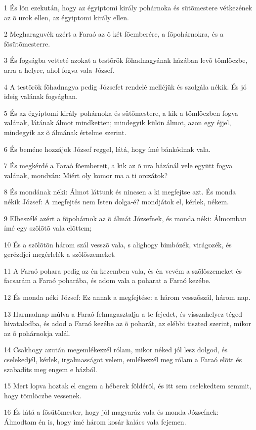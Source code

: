 \par 1 És lõn ezekután, hogy az égyiptomi király pohárnoka és sütõmestere vétkezének az õ urok ellen, az égyiptomi király ellen.
\par 2 Megharaguvék azért a Faraó az õ két fõemberére, a fõpohárnokra, és a fõsütõmesterre.
\par 3 És fogságba vetteté azokat a testõrök fõhadnagyának házában levõ tömlöczbe, arra a helyre, ahol fogva vala József.
\par 4 A testõrök fõhadnagya pedig Józsefet rendelé melléjük és szolgála nékik. És jó ideig valának fogságban.
\par 5 És az égyiptomi király pohárnoka és sütõmestere, a kik a tömlöczben fogva valának, látának álmot mindketten; mindegyik külön álmot, azon egy éjjel, mindegyik az õ álmának értelme szerint.
\par 6 És beméne hozzájok József reggel, látá, hogy ímé bánkódnak vala.
\par 7 És megkérdé a Faraó fõembereit, a kik az õ ura házánál vele együtt fogva valának, mondván: Miért oly komor ma a ti orczátok?
\par 8 És mondának néki: Álmot láttunk és nincsen a ki megfejtse azt. És monda nékik József: A megfejtés nem Isten dolga-é? mondjátok el, kérlek, nékem.
\par 9 Elbeszélé azért a fõpohárnok az õ álmát Józsefnek, és monda néki: Álmomban ímé egy szõlõtõ vala elõttem;
\par 10 És a szõlõtõn három szál vesszõ vala, s alighogy bimbózék, virágozék, és gerézdjei megérlelék a szõlõszemeket.
\par 11 A Faraó pohara pedig az én kezemben vala, és én vevém a szõlõszemeket és facsarám a Faraó poharába, és adom vala a poharat a Faraó kezébe.
\par 12 És monda néki József: Ez annak a megfejtése: a három vesszõszál, három nap.
\par 13 Harmadnap múlva a Faraó felmagasztalja a te fejedet, és visszahelyez téged hivatalodba, és adod a Faraó kezébe az õ poharát, az elébbi tiszted szerint, mikor az õ pohárnokja valál.
\par 14 Csakhogy azután megemlékezzél rólam, mikor néked jól lesz dolgod, és cselekedjél, kérlek, irgalmasságot velem, emlékezzél meg rólam a Faraó elõtt és szabadíts meg engem e házból.
\par 15 Mert lopva hoztak el engem a héberek földérõl, és itt sem cselekedtem semmit, hogy tömlöczbe vessenek.
\par 16 És látá a fõsütõmester, hogy jól magyaráz vala és monda Józsefnek: Álmodtam én is, hogy ímé három kosár kalács vala fejemen.
